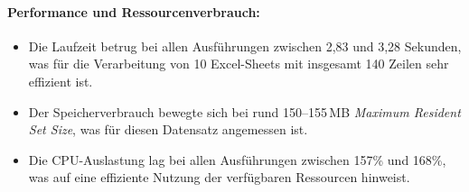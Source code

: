 \documentclass[11pt,a4paper]{article}
\begin{document}
\begin{table}[h]
    \centering
    \caption{Ergebnisse von Testfall 2}
    \label{tab:auswertung_testfall2}
\end{table}

\paragraph{Performance und Ressourcenverbrauch:}
\begin{itemize}
    \item Die Laufzeit betrug bei allen Ausführungen zwischen 2,83 und 3,28 Sekunden, was für die Verarbeitung von 10 Excel-Sheets mit insgesamt 140 Zeilen sehr effizient ist.
    \item Der Speicherverbrauch bewegte sich bei rund 150--155\,MB \emph{Maximum Resident Set Size}, was für diesen Datensatz angemessen ist.
    \item Die CPU-Auslastung lag bei allen Ausführungen zwischen 157\% und 168\%, was auf eine effiziente Nutzung der verfügbaren Ressourcen hinweist.
\end{itemize}
\end{document}
